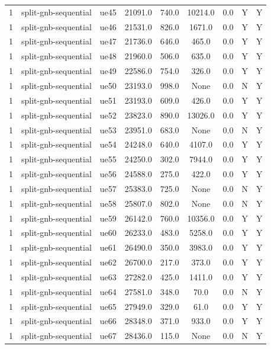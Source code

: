 \begin{table}[ht]
\begin{tabular}{|c|c|c|c|c|c|c|c|c|}
1 & split-gnb-sequential & ue45 & 21091.0 & 740.0 & 10214.0 & 0.0 & Y & Y \\
1 & split-gnb-sequential & ue46 & 21531.0 & 826.0 & 1671.0 & 0.0 & Y & Y \\
1 & split-gnb-sequential & ue47 & 21736.0 & 646.0 & 465.0 & 0.0 & Y & Y \\
1 & split-gnb-sequential & ue48 & 21960.0 & 506.0 & 635.0 & 0.0 & Y & Y \\
1 & split-gnb-sequential & ue49 & 22586.0 & 754.0 & 326.0 & 0.0 & Y & Y \\
1 & split-gnb-sequential & ue50 & 23193.0 & 998.0 & None & 0.0 & N & Y \\
1 & split-gnb-sequential & ue51 & 23193.0 & 609.0 & 426.0 & 0.0 & Y & Y \\
1 & split-gnb-sequential & ue52 & 23823.0 & 890.0 & 13026.0 & 0.0 & Y & Y \\
1 & split-gnb-sequential & ue53 & 23951.0 & 683.0 & None & 0.0 & N & Y \\
1 & split-gnb-sequential & ue54 & 24248.0 & 640.0 & 4107.0 & 0.0 & Y & Y \\
1 & split-gnb-sequential & ue55 & 24250.0 & 302.0 & 7944.0 & 0.0 & Y & Y \\
1 & split-gnb-sequential & ue56 & 24588.0 & 275.0 & 422.0 & 0.0 & Y & Y \\
1 & split-gnb-sequential & ue57 & 25383.0 & 725.0 & None & 0.0 & N & Y \\
1 & split-gnb-sequential & ue58 & 25807.0 & 802.0 & None & 0.0 & N & Y \\
1 & split-gnb-sequential & ue59 & 26142.0 & 760.0 & 10356.0 & 0.0 & Y & Y \\
1 & split-gnb-sequential & ue60 & 26233.0 & 483.0 & 5258.0 & 0.0 & Y & Y \\
1 & split-gnb-sequential & ue61 & 26490.0 & 350.0 & 3983.0 & 0.0 & Y & Y \\
1 & split-gnb-sequential & ue62 & 26700.0 & 217.0 & 373.0 & 0.0 & Y & Y \\
1 & split-gnb-sequential & ue63 & 27282.0 & 425.0 & 1411.0 & 0.0 & Y & Y \\
1 & split-gnb-sequential & ue64 & 27581.0 & 348.0 & 70.0 & 0.0 & N & Y \\
1 & split-gnb-sequential & ue65 & 27949.0 & 329.0 & 61.0 & 0.0 & Y & Y \\
1 & split-gnb-sequential & ue66 & 28348.0 & 371.0 & 933.0 & 0.0 & Y & Y \\
1 & split-gnb-sequential & ue67 & 28436.0 & 115.0 & None & 0.0 & N & Y \\

\end{tabular}
\end{table}
